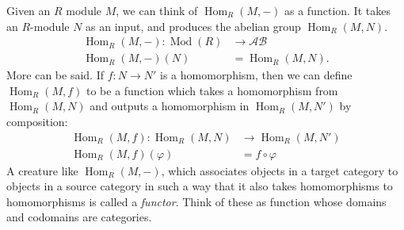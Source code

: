 \documentclass[12pt]{article}
\newcommand{\Hom}{\operatorname{Hom}}
\begin{document}
\newpage

Given an $R$ module $M$, we can think of $\Hom_R(M,-)$ as a
    function. It takes an $R$-module $N$ as an input, and produces the
    abelian group $\Hom_R(M,N)$.
    \begin{align*}
      \Hom_R(M,-): \operatorname{Mod}(R) & \rightarrow \mathcal{AB}\\
\Hom_R(M,-)(N) & = \Hom_R(M,N).
    \end{align*}
More can be said. If $f: N\rightarrow N'$ is a homomorphism, then we
can define $\Hom_R(M,f)$ to be a function which takes a homomorphism
from $\Hom_R(M,N)$ and outputs a homomorphism in $\Hom_R(M,N')$ by
composition:
\begin{align*}
  \Hom_R(M,f): \Hom_R(M,N) & \rightarrow \Hom_R(M,N')\\
\Hom_R(M,f) (\varphi) &= f\circ \varphi
\end{align*}
A creature like $\Hom_R(M,-)$, which associates objects in a target
category to objects in a source category in such a way that it also
takes homomorphisms to homomorphisms is called a \emph{functor}. Think
of these as function whose domains and codomains are categories. 
\end{document}
